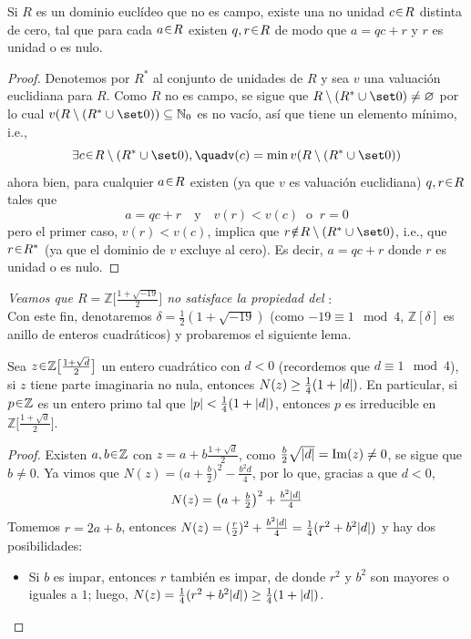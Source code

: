 \begin{sol}
\begin{enumerate}[label={\bfseries\Roman*}., wide, itemsep=1em]
\begin{lema}\label{lema:propdiv}
 Si $R$ es un dominio euclídeo que no es campo, existe una no unidad $c \en R$ distinta de cero, tal que para cada $a \en R$ existen $q,r \en R$ de modo que $a = qc + r$ y $r$ es unidad o es nulo.
\end{lema}\vspace{-1.5em}
\begin{proof}
Denotemos por $R^*$ al conjunto de unidades de $R$ y sea $v$ una valuación euclidiana para $R$. Como $R$ no es campo, se sigue que $R\setminus(R^* \cup \set0) \neq \varnothing$ por lo cual $v(R\setminus(R^* \cup \set0)) \subseteq \mathbb{N}_0$ es no vacío, así que tiene un elemento mínimo, i.e., 
\[
\exists c \en R\setminus(R^* \cup \set0),\quad%
v(c) = \min v(R\setminus(R^* \cup \set0))
\]
ahora bien, para cualquier $a \en R$ existen (ya que $v$ es valuación euclidiana) $q,r \en R$ tales que 
\[
a = qc + r%
\quad\text{y}\quad%
v(r) < v(c)  \;\;\text{o}\;\; r=0
\]
pero el primer caso, $v(r) < v(c)$, implica que $r \noten R\setminus(R^* \cup \set0)$, i.e., que $r \en R^*$ (ya que el dominio de $v$ excluye al cero). Es decir, $a = qc +r$ donde $r$ es unidad o es nulo. 
\end{proof}

\emph{Veamos que $R = \mathbb{Z}\big[\frac{1+\sqrt{-19}}{2}\big]$ no satisface la propiedad del }:\\
Con este fin, denotaremos $\delta = \frac12(1+\sqrt{-19})$ (como $-19 \equiv 1 \mod 4$, $\mathbb{Z}[\delta]$ es anillo de enteros cuadráticos) y probaremos el siguiente lema.
\begin{lema}\label{lema:normamin2}
Sea $z \en \mathbb{Z}\big[\frac{1+\sqrt{d}}{2}\big]$ un entero cuadrático con $d<0$ (recordemos que $d \equiv 1 \mod 4$), si $z$ tiene parte imaginaria no nula, entonces $N(z) \geq \frac{1}{4}(1 + \abs{d})$. En particular, si $p\en\mathbb{Z}$ es un entero primo tal que $\abs{p} < \frac14(1+\abs{d})$, entonces $p$ es irreducible en $\mathbb{Z}\big[\frac{1+\sqrt{d}}{2}\big]$.
\end{lema}\vspace{-2em}
\begin{proof}
Existen $a,b \en \mathbb{Z}$ con $z = a + b\frac{1+\sqrt{d}}{2}$, como $\frac{b}{2}\sqrt{\abs{d}} = \Im(z) \neq 0$, se sigue que $b \neq 0$. Ya vimos que $N(z) = \big(a + \tfrac{b}{2}\big)^2 - \tfrac{b^2d}{4}$, por lo que, gracias a que $d<0$,
\[
N(z) = \big(a + \tfrac{b}{2}\big)^2 + \tfrac{b^2\abs{d}}{4}
\]
Tomemos $r = 2a + b$, entonces $N(z) = (\frac{r}{2})^2 + \frac{b^2\abs{d}}{4} = \frac{1}{4}(r^2 + b^2\abs{d})$ y hay dos posibilidades:
\begin{itemize}
    \item Si $b$ es impar, entonces $r$ también es impar, de donde $r^2$ y $b^2$ son mayores o iguales a $1$; luego, $N(z) = \frac{1}{4}(r^2 + b^2\abs{d}) \geq \frac14(1 + \abs{d})$.


\end{itemize}
\end{proof}
\end{enumerate}
\end{sol}
